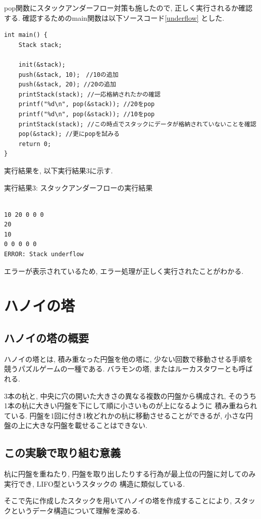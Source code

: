 \documentclass[a4j]{jsarticle}
\begin{document}
pop関数にスタックアンダーフロー対策も施したので, 正しく実行されるか確認する. 確認するためのmain関数は以下ソースコード\ref{underflow}
とした. 
\begin{lstlisting}[label = underflow, caption = スタックアンダーフロー動作確認のためのmain関数]
int main() {
	Stack stack;

	init(&stack);
	push(&stack, 10);　//10の追加
	push(&stack, 20); //20の追加
	printStack(stack); //一応格納されたかの確認
	printf("%d\n", pop(&stack)); //20をpop
	printf("%d\n", pop(&stack)); //10をpop
	printStack(stack); //この時点でスタックにデータが格納されていないことを確認
	pop(&stack); //更にpopを試みる
	return 0;
}
\end{lstlisting}
実行結果を, 以下実行結果3に示す. 
\begin{breakitembox}[l]{実行結果3: スタックアンダーフローの実行結果}
\begin{verbatim}

10 20 0 0 0
20
10
0 0 0 0 0
ERROR: Stack underflow
\end{verbatim}
\end{breakitembox}
エラーが表示されているため, エラー処理が正しく実行されたことがわかる. 

\section{ハノイの塔}
    \subsection{ハノイの塔の概要}
        ハノイの塔とは, 積み重なった円盤を他の塔に, 少ない回数で移動させる手順を競うパズルゲームの一種である. 
        バラモンの塔, またはルーカスタワーとも呼ばれる. 
        
        3本の杭と, 中央に穴の開いた大きさの異なる複数の円盤から構成され, そのうち1本の杭に大きい円盤を下にして順に小さいものが上になるように
        積み重ねられている. 円盤を1回に付き1枚どれかの杭に移動させることができるが, 小さな円盤の上に大きな円盤を載せることはできない. 
    \subsection{この実験で取り組む意義}
        杭に円盤を重ねたり, 円盤を取り出したりする行為が最上位の円盤に対してのみ実行でき, LIFO型というスタックの
        構造に類似している. 
        
        そこで先に作成したスタックを用いてハノイの塔を作成することにより, スタックというデータ構造について理解を深める. 
\end{document}
